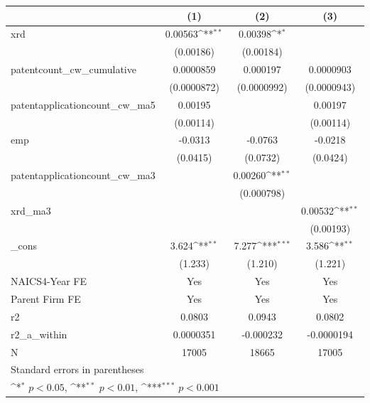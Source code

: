 {
\def\sym#1{\ifmmode^{#1}\else\(^{#1}\)\fi}
\begin{tabular}{l*{3}{c}}
\hline\hline
            &\multicolumn{1}{c}{(1)}         &\multicolumn{1}{c}{(2)}         &\multicolumn{1}{c}{(3)}         \\
\hline
xrd         &     0.00563\sym{**} &     0.00398\sym{*}  &                     \\
            &   (0.00186)         &   (0.00184)         &                     \\
[1em]
patentcount\_cw\_cumulative&   0.0000859         &    0.000197         &   0.0000903         \\
            & (0.0000872)         & (0.0000992)         & (0.0000943)         \\
[1em]
patentapplicationcount\_cw\_ma5&     0.00195         &                     &     0.00197         \\
            &   (0.00114)         &                     &   (0.00114)         \\
[1em]
emp         &     -0.0313         &     -0.0763         &     -0.0218         \\
            &    (0.0415)         &    (0.0732)         &    (0.0424)         \\
[1em]
patentapplicationcount\_cw\_ma3&                     &     0.00260\sym{**} &                     \\
            &                     &  (0.000798)         &                     \\
[1em]
xrd\_ma3     &                     &                     &     0.00532\sym{**} \\
            &                     &                     &   (0.00193)         \\
[1em]
\_cons      &       3.624\sym{**} &       7.277\sym{***}&       3.586\sym{**} \\
            &     (1.233)         &     (1.210)         &     (1.221)         \\
[1em]
NAICS4-Year FE&         Yes         &         Yes         &         Yes         \\
[1em]
Parent Firm FE&         Yes         &         Yes         &         Yes         \\
\hline
r2          &      0.0803         &      0.0943         &      0.0802         \\
r2\_a\_within &   0.0000351         &   -0.000232         &  -0.0000194         \\
N           &       17005         &       18665         &       17005         \\
\hline\hline
\multicolumn{4}{l}{\footnotesize Standard errors in parentheses}\\
\multicolumn{4}{l}{\footnotesize \sym{*} \(p<0.05\), \sym{**} \(p<0.01\), \sym{***} \(p<0.001\)}\\
\end{tabular}
}
